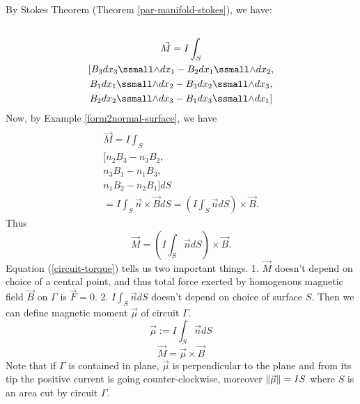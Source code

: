 \documentclass[main.tex]{subfiles}
\begin{document}
By Stokes Theorem (Theorem \ref{par-manifold-stokes}), we have:
\begin{multline}
\\\vec{M} = I \int_S \\
[B_3 dx_3\form dx_1 - B_2 dx_1\form dx_2,\\
B_1 dx_1\form dx_2 - B_3 dx_2\form dx_3,\\
B_2 dx_2\form dx_3 - B_1 dx_3 \form dx_1]\\  
\end{multline}
Now, by Example \ref{form2normal-surface}, we have
\begin{multline}
\\\vec{M} = I \int_S \\
[n_2 B_3 - n_3 B_2,\\
n_3 B_1 - n_1 B_3,\\
n_1 B_2 - n_2 B_1]dS\\
= I \int_S \vec{n}\times\vec{B} dS = (I\int_S \vec{n} dS)\times \vec{B}.
\end{multline}
Thus
\begin{equation}
\label{circuit-torque}
\vec{M} = (I\int_S \vec{n} dS)\times \vec{B}.
\end{equation}
Equation (\ref{circuit-torque}) tells us two important things. 1. $\vec{M}$ doesn't depend on choice of a central point, and thus total force exerted by homogenous magnetic field $\vec{B}$ on $\Gamma$ is $\vec{F} = 0$. 2. $I\int_S \vec{n} dS$ doesn't depend on choice of surface $S$. Then we can define magnetic moment $\vec{\mu}$ of circuit $\Gamma$.
\begin{equation}
\boxed{\vec{\mu} := I\int_S \vec{n} dS}
\end{equation}
\begin{equation}
\boxed{\vec{M} = \vec{\mu} \times \vec{B}}
\end{equation} 
Note that if $\Gamma$ is contained in plane, $\vec{\mu}$ is perpendicular to the plane and from its tip the positive current is going counter-clockwise, moreover $\norm{\vec{\mu}} = IS$ where $S$ is an area cut by circuit $\Gamma$.
\end{document}
